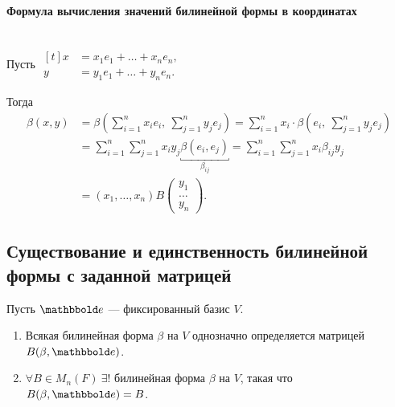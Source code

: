 \paragraph{Формула вычисления значений билинейной формы в координатах}~\\

Пусть
\begin{math}
    \begin{aligned}[t]
        x &= x_1 e_1 + \dots + x_n e_n, \\
        y &= y_1 e_1 + \dots + y_n e_n.
    \end{aligned}
\end{math}

Тогда
\begin{align*}
    \beta(x, y)
    &= \beta\left(\sum_{i = 1}^{n} x_i e_i, \ \sum_{j = 1}^{n} y_j e_j\right)
    = \sum_{i = 1}^{n} x_i \cdot \beta\left(e_i, \ \sum_{j = 1}^{n} y_j e_j\right) \\
    &= \sum_{i = 1}^{n} \sum_{j = 1}^{n} x_i y_j \underbracket{\beta(e_i, e_j)}_{\beta_{ij}}
    = \sum_{i = 1}^{n} \sum_{j = 1}^{n} x_i \beta_{ij} y_j  \\
    &= (x_1, \dots, x_n) B \begin{pmatrix} y_1 \\ \dots \\ y_n \end{pmatrix}
.\end{align*}


\subsection{Существование и единственность билинейной формы с заданной матрицей}

\begin{proposal}
    Пусть $\E$ --- фиксированный базис $V$.
    \begin{enumerate}
    \item Всякая билинейная форма $\beta$ на $V$ однозначно определяется матрицей $B(\beta, \E)$.
    \item $\forall B \in M_n(F) \ \exists!$ билинейная форма $\beta$ на $V$, такая что $B(\beta, \E) = B$.
    \end{enumerate}
\end{proposal}

